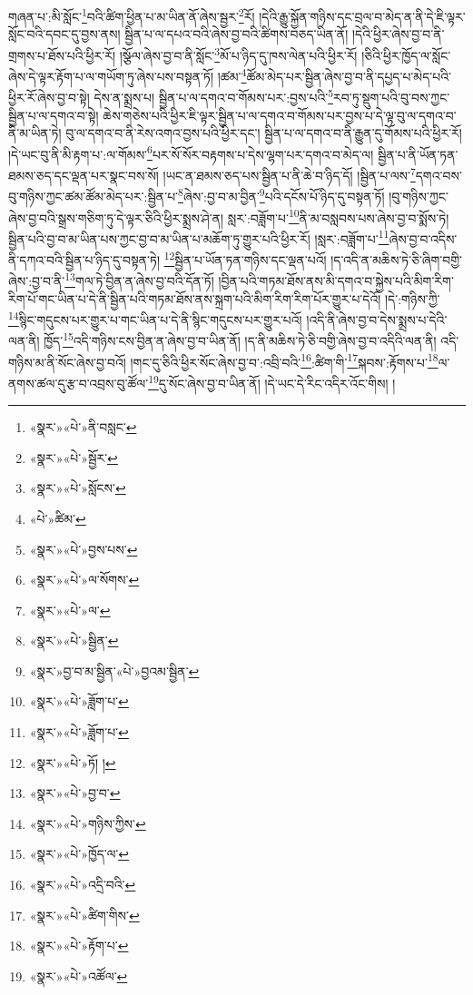 གཞན་པ་:མི་སློང་\footnote{«སྣར་»«པེ་»ནི་བསླང་}བའི་ཚིག་ཕྱིན་པ་མ་ཡིན་ནོ་ཞེས་སྦྱར་\footnote{«སྣར་»«པེ་»སྦྱོར་}རོ། །དེའི་རྒྱུ་སྐྱོན་གཉིས་དང་བྲལ་བ་མེད་ན་ནི་དེ་ཇི་ལྟར་སློང་བའི་དབང་དུ་བྱས་ནས། སྦྱིན་པ་ལ་དཔའ་བའི་ཞེས་བྱ་བའི་ཚིགས་བཅད་ཡིན་ནོ། །དེའི་ཕྱིར་ཞེས་བྱ་བ་ནི་གྲགས་པ་ཐོས་པའི་ཕྱིར་རོ། །སྩོལ་ཞེས་བྱ་བ་ནི་སློང་\footnote{«སྣར་»«པེ་»སློངས་}མོ་པ་ཉིད་དུ་ཁས་ལེན་པའི་ཕྱིར་རོ། །ཅིའི་ཕྱིར་ཁྱོད་ལ་སློང་ཞེས་དེ་ལྟར་རྟོག་པ་ལ་གཡོག་ཏུ་ཞེས་པས་བསྟན་ཏོ། །ཚམ་\footnote{«པེ་»ཚིམ་}ཚོམ་མེད་པར་སྦྱིན་ཞེས་བྱ་བ་ནི་དཔྱད་པ་མེད་པའི་ཕྱིར་རོ་ཞེས་བྱ་བ་སྟེ། དེས་ན་སྨྲས་པ། སྦྱིན་པ་ལ་དགའ་བ་གོམས་པར་:བྱས་པའི་\footnote{«སྣར་»«པེ་»བྱས་པས་}རབ་ཏུ་སྡུག་པའི་བུ་བས་ཀྱང་སྦྱིན་པ་ལ་དགའ་བ་སྟེ། ཆེས་གཅེས་པའི་ཕྱིར་ཇི་ལྟར་སྦྱིན་པ་ལ་དགའ་བ་གོམས་པར་བྱས་པ་དེ་ལྟ་བུ་ལ་དགའ་བ་ནི་མ་ཡིན་ཏེ། བུ་ལ་དགའ་བ་ནི་རེས་འགའ་བྱས་པའི་ཕྱིར་དང་། སྦྱིན་པ་ལ་དགའ་བ་ནི་རྒྱུན་དུ་གོམས་པའི་ཕྱིར་རོ། །དེ་ཡང་བུ་ནི་མི་རྟག་པ་:ལ་གོམས་\footnote{«སྣར་»«པེ་»ལ་སོགས་}པར་སོ་སོར་བརྟགས་པ་དེས་ལྷག་པར་དགའ་བ་མེད་ལ། སྦྱིན་པ་ནི་ཡོན་ཏན་ཐམས་ཅད་དང་ལྡན་པར་སྣང་བས་སོ། །ཡང་ན་ཐམས་ཅད་པས་སྦྱིན་པ་ནི་ཆེ་བ་ཉིད་དོ། །སྦྱིན་པ་ལས་\footnote{«སྣར་»«པེ་»ལ་}དགའ་བས་བུ་གཉིས་ཀྱང་ཚམ་ཚོམ་མེད་པར་:སྦྱིན་པ་\footnote{«སྣར་»«པེ་»སྦྱིན་}ཞེས་:བྱ་བ་མ་བྱིན་\footnote{«སྣར་»བྱ་བ་མ་སྦྱིན་«པེ་»བྱའམ་སྦྱིན་}པའི་དངོས་པོ་ཉིད་དུ་བསྟན་ཏོ། །བུ་གཉིས་ཀྱང་ཞེས་བྱ་བའི་སྒྲས་གཅིག་ཏུ་དེ་ལྟར་ཅིའི་ཕྱིར་སྨྲས་ཤེ་ན། སླར་:བཟློག་པ་\footnote{«སྣར་»«པེ་»ཟློག་པ་}ནི་མ་བསླབས་པས་ཞེས་བྱ་བ་སྨོས་ཏེ། སྦྱིན་པའི་བྱ་བ་མ་ཡིན་པས་ཀྱང་བྱ་བ་མ་ཡིན་པ་མཆོག་ཏུ་གྱུར་པའི་ཕྱིར་རོ། །སླར་:བཟློག་པ་\footnote{«སྣར་»«པེ་»ཟློག་པ་}ཞེས་བྱ་བ་འདིས་ནི་དཀའ་བའི་སྦྱིན་པ་ཉིད་དུ་བསྟན་ཏེ། \footnote{«སྣར་»«པེ་»ཏོ། ། }སྦྱིན་པ་ཡོན་ཏན་གཉིས་དང་ལྡན་པའོ། །ད་འདི་ན་མཆིས་ཏེ་ཅི་ཞིག་བགྱི་ཞེས་:བྱ་བ་ནི་\footnote{«སྣར་»«པེ་»བྱ་བ་}གལ་ཏེ་བྱིན་ན་ཞེས་བྱ་བའི་དོན་ཏོ། །བྱིན་པའི་གཏམ་ཐོས་ནས་མི་དགའ་བ་སྐྱེས་པའི་མིག་རིག་རིག་པོ་གང་ཡིན་པ་དེ་ནི་སྦྱིན་པའི་གཏམ་ཐོས་ནས་སྐྲག་པའི་མིག་རིག་རིག་པོར་གྱུར་པ་དེའོ། །དེ་:གཉིས་ཀྱི་\footnote{«སྣར་»«པེ་»གཉིས་ཀྱིས་}སྙིང་གདུངས་པར་གྱུར་པ་གང་ཡིན་པ་དེ་ནི་སྙིང་གདུངས་པར་གྱུར་པའོ། །འདི་ནི་ཞེས་བྱ་བ་དེས་སྨྲས་པ་དེའི་ལན་ནི། ཁྱོད་\footnote{«སྣར་»«པེ་»ཁྱོད་ལ་}འདི་གཉིས་ངས་བྱིན་ན་ཞེས་བྱ་བ་ཡིན་ནོ། །ད་ནི་མཆིས་ཏེ་ཅི་བགྱི་ཞེས་བྱ་བ་འདིའི་ལན་ནི། འདི་གཉིས་མ་ནི་སོང་ཞེས་བྱ་བའོ། །གང་དུ་ཅིའི་ཕྱིར་སོང་ཞེས་བྱ་བ་:འབྲི་བའི་\footnote{«སྣར་»«པེ་»འདྲི་བའི་}:ཚིག་གི་\footnote{«སྣར་»«པེ་»ཚིག་གིས་}སྐབས་:རྟོགས་པ་\footnote{«སྣར་»«པེ་»རྟོག་པ་}ལ་ནགས་ཚལ་དུ་རྩ་བ་འབྲས་བུ་ཚོལ་\footnote{«སྣར་»«པེ་»འཚོལ་}དུ་སོང་ཞེས་བྱ་བ་ཡིན་ནོ། །དེ་ཡང་དེ་རིང་འདིར་འོང་གིས། །
